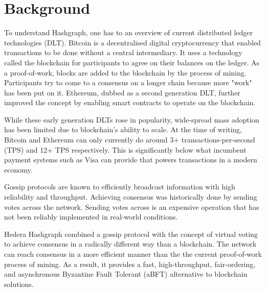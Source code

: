 \section{Background}

To understand Hashgraph, one has to an overview of current distributed ledger technologies (DLT). Bitcoin\cite{nakamoto2008peer} is a decentralised digital cryptocurrency that enabled transactions to be done without a central intermediary. It uses a technology called the blockchain for participants to agree on their balances on the ledger. As a proof-of-work, blocks are added to the blockchain by the process of mining. Participants try to come to a consensus on a longer chain because more "work" has been put on it. Ethereum\cite{wood2014ethereum}, dubbed as a second generation DLT, further improved the concept by enabling smart contracts to operate on the blockchain.

While these early generation DLTs rose in popularity, wide-spread mass adoption has been limited due to blockchain's ability to scale. At the time of writing, Bitcoin and Ethereum can only currently do around 3+ transactions-per-second (TPS)\cite{bitcointps} and 12+ TPS respectively\cite{ethereumtps}. This is significantly below what incumbent payment systems such as Visa can provide\cite{visafactsheet} that powers transactions in a modern economy.

Gossip protocols are known to efficiently broadcast information with high reliability and throughput\cite{birman}. Achieving consensus was historically done by sending votes across the network\cite{berman1989towards}. Sending votes across is an expensive operation that has not been reliably implemented in real-world conditions.

Hedera Hashgraph\cite{baird2016} combined a gossip protocol with the concept of virtual voting to achieve consensus in a radically different way than a blockchain. The network can reach consensus in a more efficient manner than the the current proof-of-work process of mining. As a result, it provides a fast, high-throughput, fair-ordering, and asynchronous Byzantine Fault Tolerant (aBFT) alternative to blockchain solutions.
